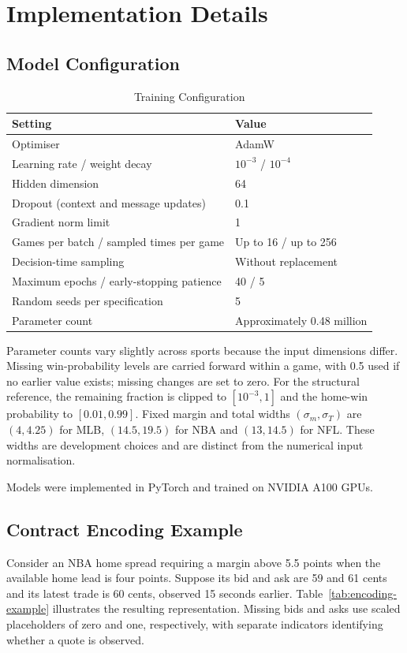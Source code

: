 \documentclass[12pt,a4paper,oneside]{report}
\newcommand{\tablenote}[1]{\par\smallskip{\footnotesize\raggedright #1\par}}
\begin{document}
\chapter{Implementation Details}\label{sec:implementation}
\section{Model Configuration}
\begin{table}[htbp]\centering
\caption{Training Configuration}
\label{tab:training-config}
\begin{tabular}{@{}ll@{}}
\toprule
Setting & Value\\
\midrule
Optimiser & AdamW\\
Learning rate / weight decay & $10^{-3}$ / $10^{-4}$\\
Hidden dimension & 64\\
Dropout (context and message updates) & 0.1\\
Gradient norm limit & 1\\
Games per batch / sampled times per game & Up to 16 / up to 256\\
Decision-time sampling & Without replacement\\
Maximum epochs / early-stopping patience & 40 / 5\\
Random seeds per specification & 5\\
Parameter count & Approximately 0.48 million\\
\bottomrule
\end{tabular}
\tablenote{Common settings for MLB, NBA and NFL.}
\end{table}
Parameter counts vary slightly across sports because the input dimensions
differ. Missing win-probability levels are carried forward within a game, with
0.5 used if no earlier value exists; missing changes are set to zero.
For the structural reference, the remaining fraction is clipped to
$[10^{-3},1]$ and the home-win probability to $[0.01,0.99]$. Fixed margin and
total widths $(\sigma_m,\sigma_T)$ are $(4,4.25)$ for MLB, $(14.5,19.5)$ for
NBA and $(13,14.5)$ for NFL. These widths are development choices and are
distinct from the numerical input normalisation.

Models were implemented in PyTorch and trained on NVIDIA A100 GPUs.

\section{Contract Encoding Example}\label{sec:encoding-example}
Consider an NBA home spread requiring a margin above 5.5 points when the
available home lead is four points. Suppose its bid and ask are 59 and 61 cents
and its latest trade is 60 cents, observed 15 seconds earlier.
Table~\ref{tab:encoding-example} illustrates the resulting representation.
Missing bids and asks use scaled placeholders of zero and one, respectively,
with separate indicators identifying whether a quote is observed.
\end{document}
